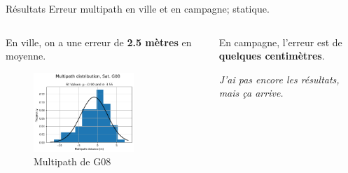 \documentclass[xcolor=dvipsnames,envcountsect]{beamer}
\begin{document}
\begin{frame}{Résultats}
	Erreur multipath en ville et en campagne; statique.
	\newline
	\begin{columns}
		\begin{column}{0.5\textwidth}
			{\small En ville, on a une erreur de \textbf{2.5 mètres} en moyenne.}
			\begin{figure}
				\centering
				\includegraphics[width=0.7\textwidth]{./Figures/MP_G08_dis.png}
				\caption {Multipath de G08}
			\end{figure}
		\end{column}

		\begin{column}{0.5\textwidth}
			En campagne, l'erreur est de \textbf{quelques centimètres}.
			\begin{figure}
				\centering
			\end{figure}
			\textit{J'ai pas encore les résultats, mais ça arrive.}
		\end{column}
	\end{columns}
\end{frame}
\end{document}
